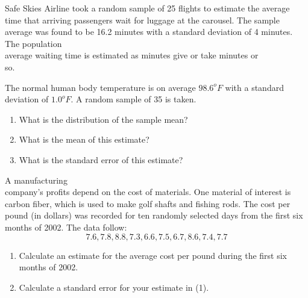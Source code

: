 \documentclass[11pt, chapterprefix=true]{scrbook}\usepackage[]{graphicx}\usepackage[]{color}
\begin{document}
\begin{exercises}
\begin{solution}
\end{solution}

\begin{exercise}  %

Safe Skies Airline took a random sample of 25 flights to estimate the average time that arriving passengers wait for luggage at the carousel.  The sample average was found to be 16.2 minutes with a standard deviation of 4 minutes.  The population \\ average waiting time is estimated as \underline{\phantom{xxxxxxxx}} minutes give or take \underline{\phantom{xxxxxxxx}} minutes or \\ so.

\end{exercise}
\begin{solution}  %

\end{solution}

\begin{exercise}  %

The normal human body temperature is on average $98.6^o F$ with a standard deviation of $1.0^o F$. A random sample of 35 is taken. 

\begin{enumerate}
\item What is the distribution of the sample mean?
\item What is the mean of this estimate? 
\item What is the standard error of this estimate?
\end{enumerate}

\end{exercise}
\begin{solution}  %

\end{solution}

\begin{exercise}  %

A manufacturing \\ company's profits depend on the cost of materials.  One material of interest is carbon fiber, which is used to make golf shafts and fishing rods.  The cost per pound (in dollars) was recorded for ten randomly selected days from the first six months of 2002. The data follow:
            $$7.6, 7.8, 8.8, 7.3, 6.6, 7.5, 6.7, 8.6, 7.4, 7.7$$
            
\begin{enumerate}            
  \item Calculate an estimate for the average cost per pound during the first six \\ months of 2002.
  \item Calculate a standard error for your estimate in (1).
\end{enumerate}  


\end{exercise}
\end{exercises}
\end{document}
